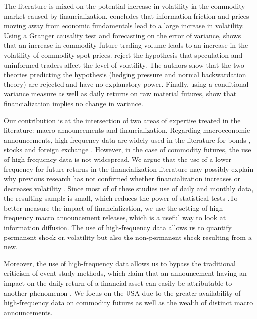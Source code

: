 \documentclass[12pt]{article}
\begin{document}
The literature is mixed on the potential increase in volatility in the commodity market caused by financialization. \citet{singleton2014investor} concludes that information friction and prices moving away from economic fundamentals lead to a large increase in volatility. Using a Granger causality test and forecasting on the error of variance, \citet{yang2005futures} shows that an increase in commodity future trading volume leads to an increase in the volatility of commodity spot prices. \citet{bryant2006causality} reject the hypothesis that speculation and uninformed traders affect the level of volatility. The authors show that the two theories predicting the hypothesis (hedging pressure and normal backwardation theory) are rejected and have no explanatory power. Finally, using a conditional variance measure as well as daily returns on raw material futures, \citet{bohl2013does} show that financialization implies no change in variance.

Our contribution is at the intersection of two areas of expertise treated in the literature: macro announcements and financialization. Regarding macroeconomic announcements, high frequency data are widely used in the literature for bonds  \citep{andersen2007real, hu2013noise, balduzzi2001economic,lee1995oil, hautsch2011impact, kurov2019price}, stocks \citep{andersen2007real,bernile2016can,kurov2019price} and foreign exchange \citep{lee1995oil,andersen2003micro}. However, in the case of commodity futures, the use of high frequency data is not widespread. We argue that the use of a lower frequency for future returns in the financialization literature may possibly explain why previous research has not confirmed whether financialization increases or decreases volatility \citep{tang2012index,brunetti2016speculators,irwin2012testing,stoll2010commodity,alquist2013role}. Since most of of these studies use of daily and monthly data, the resulting sample is small, which reduces the power of statistical tests \citep{irwin2009devil}.To better measure the impact of financialization, we use the setting of high-frequency macro announcement releases, which is a useful way to look at information diffusion. The use of high-frequency data allows us to quantify permanent shock on volatility but also the non-permanent shock resulting from a new.

Moreover, the use of high-frequency data allows us to bypass the traditional criticism of event-study methods, which claim that an announcement having an impact on the daily return of a financial asset can easily be attributable to another phenomenon \citep{kothari2007econometrics}. We focus on the USA due to the greater availability of high-frequency data on commodity futures as well as the wealth of distinct macro announcements.
\end{document}
